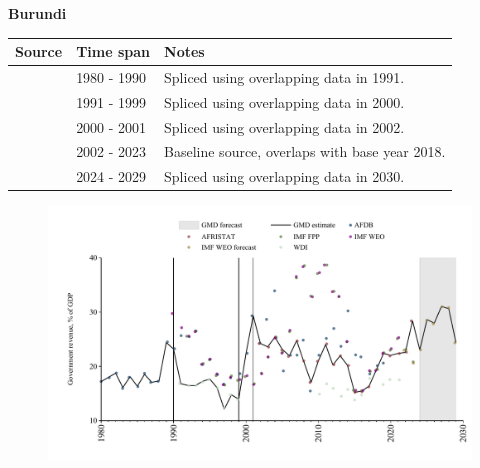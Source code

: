 \documentclass[12pt,a4paper,landscape]{article}
\begin{document}
\begin{adjustbox}{max totalsize={\paperwidth}{\paperheight},center}
\begin{minipage}[t][\textheight][t]{\textwidth}
\vspace*{0.5cm}
{}
\begin{center}
{\Large\bfseries Burundi}
\end{center}
\vspace{0.5cm}
\begin{table}[H]
\centering
\small
\begin{tabular}{|l|l|l|}
\hline
\textbf{Source} & \textbf{Time span} & \textbf{Notes} \\
\hline
\rowcolor{white}\cite{AFDB}& 1980 - 1990 &Spliced using overlapping data in 1991.\\
\rowcolor{lightgray}\cite{WDI}& 1991 - 1999 &Spliced using overlapping data in 2000.\\
\rowcolor{white}\cite{AFDB}& 2000 - 2001 &Spliced using overlapping data in 2002.\\
\rowcolor{lightgray}\cite{AFRISTAT}& 2002 - 2023 &Baseline source, overlaps with base year 2018.\\
\rowcolor{white}\cite{IMF_WEO_forecast}& 2024 - 2029 &Spliced using overlapping data in 2030.\\
\hline
\end{tabular}
\end{table}
\begin{figure}[H]
\centering
\includegraphics[width=\textwidth,height=0.6\textheight,keepaspectratio]{graphs/BDI_govrev_GDP.pdf}
\end{figure}
\end{minipage}
\end{adjustbox}
\end{document}
